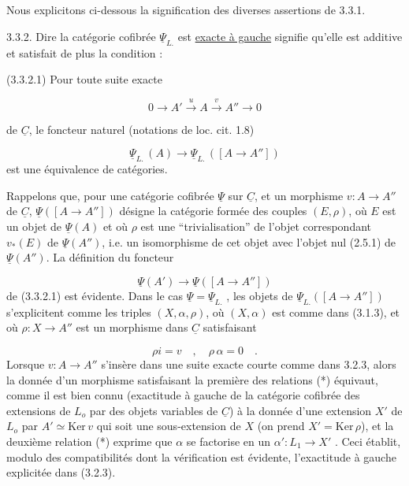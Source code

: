 Nous explicitons ci-dessous la signification des diverses assertions de 3.3.1.

3.3.2. Dire la catégorie cofibrée $\underline{\Psi}_{L.}$ est \underline{exacte à gauche} signifie qu'elle est additive et satisfait de plus la condition :

(3.3.2.1) Pour toute suite exacte

\begin{equation*}
0 \longrightarrow A' \stackrel{u}{\longrightarrow} A \stackrel{v}{\longrightarrow} A'' \longrightarrow 0 
\end{equation*}


 de $\underline{C}$, le foncteur naturel (notations de loc. cit. 1.8)

\begin{equation*}
\underline{\Psi}_{L.}\,(A) \longrightarrow \underline{\Psi}_{L.}\,([A \longrightarrow A''])
\end{equation*}
est une équivalence de catégories.

Rappelons que, pour une catégorie cofibrée $\underline{\Psi}$ sur $\underline{C}$, et un morphisme $v : A \longrightarrow A''$ de $\underline{C}$, $\underline{\Psi}([A \longrightarrow A''])$ désigne la catégorie formée des couples $(E,\rho)$, où $E$ est un objet de $\underline{\Psi}(A)$ et où $\rho$ est une ``trivialisation'' de l'objet correspondant $v_*(E)$ de $\underline{\Psi}(A'')$, i.e. un isomorphisme de cet objet avec l'objet nul (2.5.1) de $\underline{\Psi}(A'')$. La définition du foncteur

\begin{equation*}
\underline{\Psi}(A') \longrightarrow \underline{\Psi}([A \longrightarrow A''])
\end{equation*}
de (3.3.2.1) est évidente. Dans le cas $\underline{\Psi} = \underline{\Psi}_{L.}$ , les objets de $\underline{\Psi}_{L.}([A \longrightarrow A''])$ s'explicitent comme les triples $(X,\alpha,\rho)$, où $(X,\alpha)$ est comme dans (3.1.3), et où $\rho : X \longrightarrow A''$ est un morphisme dans $\underline{C}$ satisfaisant

\begin{equation}\tag{*}
\rho i = v \quad , \quad \rho\, \alpha = 0 \quad .
\end{equation}
Lorsque $v: A \longrightarrow A''$ s'insère dans une suite exacte courte comme dans 3.2.3, alors la donnée d'un morphisme satisfaisant la première des relations (*) équivaut, comme il est bien connu (exactitude à gauche de la catégorie cofibrée des extensions de $L_o$ par des objets variables de $\underline{C}$) à la donnée d'une extension $X'$ de $L_o$ par $A' \simeq \mathrm{Ker}\, v$ qui soit une sous-extension de $X$ (on prend $X' = \mathrm{Ker}\, \rho$), et la deuxième relation (*) exprime que $\alpha$ se factorise en un $\alpha' : L_1 \longrightarrow X'$ . Ceci établit, modulo des compatibilités dont la vérification est évidente, l'exactitude à gauche explicitée dans (3.2.3).


